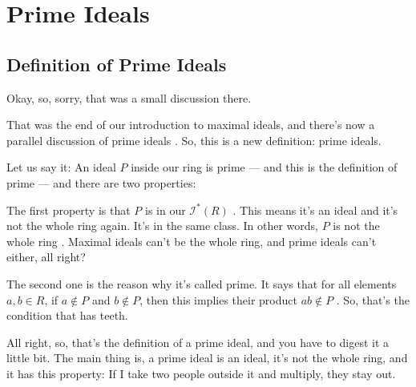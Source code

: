 \section{Prime Ideals}

\subsection{Definition of Prime Ideals}

\begin{speech}[00:47:51 - 00:49:27]
Okay, so, sorry, that was a small discussion there.

That was the end of our introduction to maximal ideals, and there's now a parallel discussion of prime ideals . So, this is a new definition: prime ideals.

Let us say it: An ideal $P$ inside our ring is prime  --- and this is the definition of prime  --- and there are two properties:

The first property is that $P$ is in our $\mathscr{I}^*(R)$ . This means it's an ideal and it's not the whole ring again. It's in the same class. In other words, $P$ is not the whole ring . Maximal ideals can't be the whole ring, and prime ideals can't either, all right?

The second one is the reason why it's called prime. It says that for all elements $a, b \in R$, if $a \notin P$ and $b \notin P$, then this implies their product $ab \notin P$ . So, that's the condition that has teeth.

All right, so, that's the definition of a prime ideal, and you have to digest it a little bit. The main thing is, a prime ideal is an ideal, it's not the whole ring, and it has this property: If I take two people outside it and multiply, they stay out.
\end{speech}

